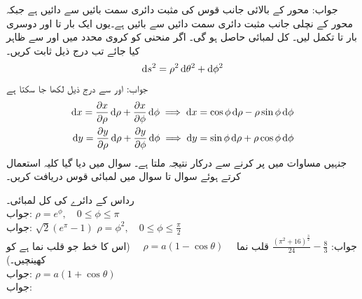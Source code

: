 جواب: محور کے بالائی جانب قوس کی مثبت دائری سمت بائیں سے دائیں ہے جبکہ محور کے نچلی جانب مثبت دائری سمت دائیں سے بائیں ہے۔یوں ایک بار  تا  اور دوسری بار  تا  تکمل لیں۔ کل لمبائی  حاصل ہو گی۔
\quad اگر منحنی کو کروی محدد میں  اور  سے ظاہر کیا جائے تب درج ذیل ثابت کریں۔
\begin{align*}
\dif s^2=\rho^2\dif \theta^2+\dif \phi^2
\end{align*}
جواب: اور  سے درج ذیل لکھا جا سکتا ہے
\begin{align*}
\dif x=\frac{\partial x}{\partial \rho}\dif \rho+\frac{\partial x}{\partial \phi}\dif \phi  \implies \dif x=\cos \phi \dif \rho-\rho\sin \phi\dif \phi\\
\dif y=\frac{\partial y}{\partial \rho}\dif \rho+\frac{\partial y}{\partial \phi}\dif \phi\implies \dif y=\sin \phi \dif \rho+\rho\cos \phi \dif \phi 
\end{align*}
جنہیں مساوات  میں پر کرنے سے درکار نتیجہ ملتا ہے۔
سوال  میں دیا گیا کلیہ استعمال کرتے ہوئے سوال  تا سوال  میں لمبائی قوس دریافت کریں۔

\quad رداس  کے دائرے کی کل لمبائی۔\\
جواب:
\quad
$\rho=e^{\phi},\quad 0\le \phi \le \pi$\\
جواب:
$\sqrt{2}(e^{\pi}-1)$
\quad
$\rho=\phi^2,\quad 0\le \phi \le \tfrac{\pi}{2}$\\
جواب:
$\tfrac{(\pi^2+16)^{\tfrac{3}{2}}}{24}-\tfrac{8}{3}$
\quad قلب نما 
$\quad \rho=a(1-\cos \theta)\quad $
(اس کا خط جو قلب نما ہے کو کھینچیں۔)\\
جواب:
\quad
$\rho=a(1+\cos \theta)$\\
جواب:

